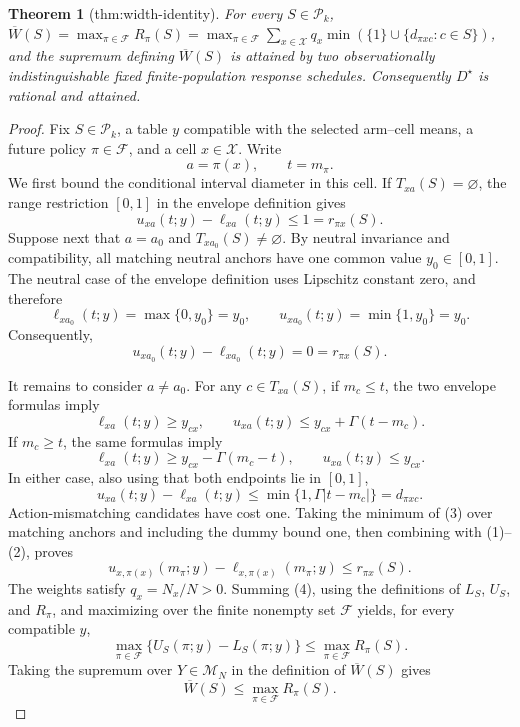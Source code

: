 \documentclass{article}
\newtheorem{theorem}{Theorem}
\begin{document}
\begin{theorem}[thm:width-identity]\label{thm:width-identity}
For every \(S\in\mathcal P_k\), \(\overline W(S)=\max_{\pi\in\mathcal F}R_{\pi}(S)=\max_{\pi\in\mathcal F}\sum_{x\in\mathcal X}q_x\min(\{1\}\cup\{d_{\pi xc}:c\in S\})\), and the supremum defining \(\overline W(S)\) is attained by two observationally indistinguishable fixed finite-population response schedules. Consequently \(D^{\star}\) is rational and attained.
\end{theorem}
\begin{proof}
Fix \(S\in\mathcal P_k\), a table \(y\) compatible with the selected arm--cell means, a future policy \(\pi\in\mathcal F\), and a cell \(x\in\mathcal X\).  Write
\[
a=\pi(x),\qquad t=m_\pi.
\]
We first bound the conditional interval diameter in this cell.  If
\(T_{xa}(S)=\varnothing\), the range restriction \([0,1]\) in the envelope
definition gives
\[
u_{xa}(t;y)-\ell_{xa}(t;y)\leq 1=r_{\pi x}(S).                    \tag{1}
\]
Suppose next that \(a=a_0\) and \(T_{x a_0}(S)\neq\varnothing\).  By
neutral invariance and compatibility, all matching neutral anchors have one
common value \(y_0\in[0,1]\).  The neutral case of the envelope definition
uses Lipschitz constant zero, and therefore
\[
\ell_{x a_0}(t;y)=\max\{0,y_0\}=y_0,
\qquad
u_{x a_0}(t;y)=\min\{1,y_0\}=y_0.
\]
Consequently,
\[
u_{x a_0}(t;y)-\ell_{x a_0}(t;y)=0=r_{\pi x}(S).                 \tag{2}
\]

It remains to consider \(a\neq a_0\).  For any
\(c\in T_{xa}(S)\), if \(m_c\leq t\), the two envelope formulas imply
\[
\ell_{xa}(t;y)\geq y_{cx},
\qquad
u_{xa}(t;y)\leq y_{cx}+\Gamma(t-m_c).
\]
If \(m_c\geq t\), the same formulas imply
\[
\ell_{xa}(t;y)\geq y_{cx}-\Gamma(m_c-t),
\qquad
u_{xa}(t;y)\leq y_{cx}.
\]
In either case, also using that both endpoints lie in \([0,1]\),
\[
u_{xa}(t;y)-\ell_{xa}(t;y)
\leq \min\{1,\Gamma|t-m_c|\}=d_{\pi xc}.                         \tag{3}
\]
Action-mismatching candidates have cost one.  Taking the minimum of (3)
over matching anchors and including the dummy bound one, then combining
with (1)--(2), proves
\[
u_{x,\pi(x)}(m_\pi;y)-\ell_{x,\pi(x)}(m_\pi;y)
\leq r_{\pi x}(S).                                                \tag{4}
\]
The weights satisfy \(q_x=N_x/N>0\).  Summing (4), using the definitions of
\(L_S\), \(U_S\), and \(R_\pi\), and maximizing over the finite nonempty
set \(\mathcal F\) yields, for every compatible \(y\),
\[
\max_{\pi\in\mathcal F}
\{U_S(\pi;y)-L_S(\pi;y)\}
\leq \max_{\pi\in\mathcal F}R_\pi(S).
\]
Taking the supremum over \(Y\in\mathcal M_N\) in the definition of
\(\overline W(S)\) gives
\[
\overline W(S)\leq\max_{\pi\in\mathcal F}R_\pi(S).              \tag{5}
\]


\end{proof}
\end{document}
